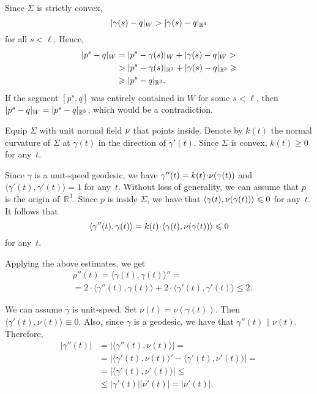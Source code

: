 \begin{multicols}{2}
Since $\Sigma$ is strictly convex, 
\[ \dist{\gamma (s)}{q}W > \dist{\gamma(s)}{q}{\mathbb{R}^3} \]
for all $s < \ell$.
Hence,
\begin{align*}
\dist{p^s}{q}W&=\dist{p^s}{\gamma(s)}W+\dist{\gamma (s)}{q}W 
> 
\\
&>\dist{p^s}{\gamma(s)}{\mathbb{R}^3} + \dist{ \gamma (s)}{q}{\mathbb{R}^3} 
\ge
\\
&\ge\dist{p^s}{q}{\mathbb{R}^3}. 
\end{align*}
If the segment $[p^s,q]$ was entirely contained in $W$ for some $s<\ell$, then $\dist{p^s}{q}W = \dist{p^s}{q}{\mathbb{R}^3} $, which would be a contradiction.

Equip $\Sigma$ with unit normal field $\nu$ that points inside.
Denote by $k(t)$ the normal curvature of $\Sigma$ at $\gamma(t)$ in the direction of $\gamma'(t)$.
Since $\Sigma$ is convex, $k(t)\ge 0$ for any~$t$.

Since $\gamma$ is a unit-speed geodesic, we have $\gamma''(t)=k(t)\cdot\Norm(\gamma(t))$ and $\langle\gamma'(t),\gamma'(t)\rangle=1$ for any~$t$.
Without loss of generality, we can assume that $p$ is the origin of~$\mathbb{R}^3$.
Since $p$ is inside $\Sigma$, we have that $\langle\gamma(t),\nu(\gamma(t))\rangle\leqslant 0$ for any~$t$.
It follows that 
\[\langle\gamma''(t),\gamma(t)\rangle=k(t)\cdot \langle\gamma(t),\Norm(\gamma(t))\rangle\le 0\]
for any~$t$.

Applying the above estimates, we get 
\begin{align*}
&\rho''(t)
=\langle\gamma(t),\gamma(t)\rangle''=
\\
&=2\cdot\langle\gamma''(t),\gamma(t)\rangle+2\cdot\langle\gamma'(t),\gamma'(t)\rangle\le 2.
\end{align*}


We can assume $\gamma$ is unit-speed.
Set $\nu (t) = \nu ( \gamma (t)) $. 
Then $\langle \gamma'(t) , \nu (t) \rangle \equiv 0$. Also, since $\gamma$ is a geodesic, we have that $\gamma''(t) \parallel \nu (t)$.
Therefore,
\[
\begin{aligned}
|\gamma''(t)|
&=|\langle\gamma''(t),\nu(t)\rangle|=
\\
&=|\langle\gamma'(t),\nu(t)\rangle'-\langle\gamma'(t),\nu'(t)\rangle|=
\\
&=|\langle\gamma'(t),\nu'(t)\rangle|\le
\\
&\le|\gamma'(t)||\nu'(t)|=|\nu'(t)|.
\end{aligned}
\]


\end{multicols}

